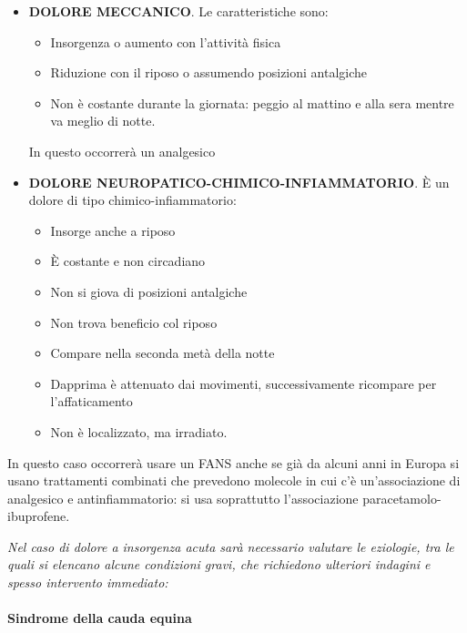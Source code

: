 \begin{itemize}
\item
   
  \textbf{DOLORE MECCANICO}. Le caratteristiche sono:

\begin{itemize}
\item
  Insorgenza o aumento con l'attività fisica
\item
  Riduzione con il riposo o assumendo posizioni antalgiche
\item
  Non è costante durante la giornata: peggio al mattino e alla sera
  mentre va meglio di notte.
\end{itemize}

In questo occorrerà un analgesico

\item
   
  \textbf{DOLORE NEUROPATICO-CHIMICO-INFIAMMATORIO}. È un dolore di tipo
  chimico-infiammatorio:
   


\begin{itemize}
\item
  Insorge anche a riposo
\item
  È costante e non circadiano
\item
  Non si giova di posizioni antalgiche
\item
  Non trova beneficio col riposo
\item
  Compare nella seconda metà della notte
\item
  Dapprima è attenuato dai movimenti, successivamente ricompare per
  l'affaticamento
\item
  Non è localizzato, ma irradiato.
\end{itemize}
\end{itemize}
 
In questo caso occorrerà usare un FANS anche se già da alcuni anni in
Europa si usano trattamenti combinati che prevedono molecole in cui c'è
un'associazione di analgesico e antinfiammatorio: si usa soprattutto
l'associazione paracetamolo-ibuprofene.
 

\emph{Nel caso di \emph{dolore a insorgenza acuta} sarà necessario
valutare le eziologie, tra le quali si elencano alcune condizioni gravi,
che richiedono ulteriori indagini e spesso intervento immediato: }

\paragraph{Sindrome della cauda equina}



